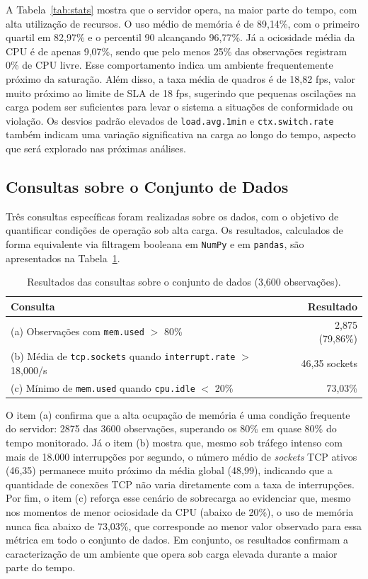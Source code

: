 \documentclass[11pt,a4paper]{article}
\begin{document}
A Tabela~\ref{tab:stats} mostra que o servidor opera, na maior parte do tempo, com alta utilização de recursos. O uso médio de memória é de 89{,}14\%, com o primeiro quartil em 82{,}97\% e o percentil 90 alcançando 96{,}77\%. Já a ociosidade média da CPU é de apenas 9{,}07\%, sendo que pelo menos 25\% das observações registram 0\% de CPU livre. Esse comportamento indica um ambiente frequentemente próximo da saturação. Além disso, a taxa média de quadros é de 18{,}82 fps, valor muito próximo ao limite de SLA de 18 fps, sugerindo que pequenas oscilações na carga podem ser suficientes para levar o sistema a situações de conformidade ou violação. Os desvios padrão elevados de \texttt{load.avg.1min} e \texttt{ctx.switch.rate} também indicam uma variação significativa na carga ao longo do tempo, aspecto que será explorado nas próximas análises.


\subsection{Consultas sobre o Conjunto de Dados}

Três consultas específicas foram realizadas sobre os dados, com o objetivo de quantificar condições de operação sob alta carga. Os resultados, calculados de forma equivalente via filtragem booleana em \texttt{NumPy} e em \texttt{pandas}, são apresentados na Tabela~\ref{tab:queries}.

\begin{table}[H]
\centering
\caption{Resultados das consultas sobre o conjunto de dados (3,600 observações).}
\label{tab:queries}
\begin{tabular}{lr}
\toprule
\textbf{Consulta} & \textbf{Resultado} \\
\midrule
(a) Observações com \texttt{mem.used} $>$ 80\% & 2,875 (79{,}86\%) \\
(b) Média de \texttt{tcp.sockets} quando \texttt{interrupt.rate} $>$ 18,000/s & 46{,}35 sockets \\
(c) Mínimo de \texttt{mem.used} quando \texttt{cpu.idle} $<$ 20\% & 73{,}03\% \\
\bottomrule
\end{tabular}
\end{table}

O item (a) confirma que a alta ocupação de memória é uma condição frequente do servidor: 2875 das 3600 observações, superando os 80\% em quase 80\% do tempo monitorado. Já o item (b) mostra que, mesmo sob tráfego intenso com mais de 18.000 interrupções por segundo, o número médio de \emph{sockets} TCP ativos (46{,}35) permanece muito próximo da média global (48{,}99), indicando que a quantidade de conexões TCP não varia diretamente com a taxa de interrupções. Por fim, o item (c) reforça esse cenário de sobrecarga ao evidenciar que, mesmo nos momentos de menor ociosidade da CPU (abaixo de 20\%), o uso de memória nunca fica abaixo de 73{,}03\%, que corresponde ao menor valor observado para essa métrica em todo o conjunto de dados. Em conjunto, os resultados confirmam a caracterização de um ambiente que opera sob carga elevada durante a maior parte do tempo.
\end{document}
